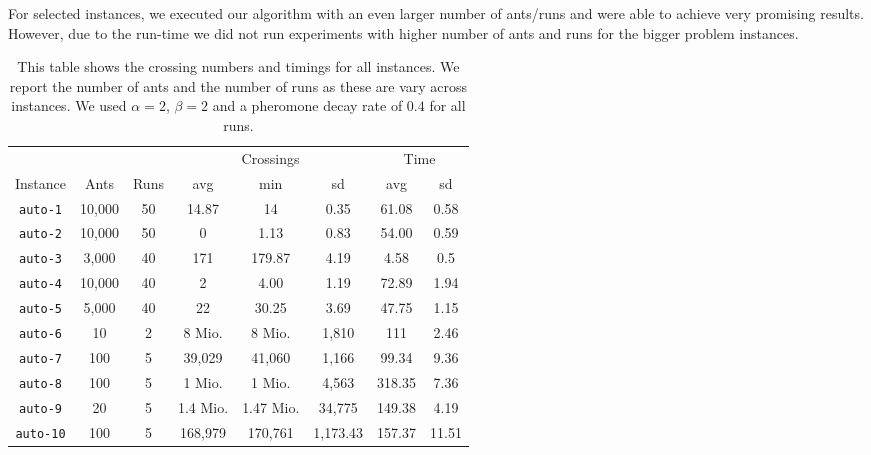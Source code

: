 \documentclass{scrartcl}
\begin{document}
For selected instances, we executed our algorithm with an even larger
number of ants/runs and were able to achieve very promising
results. However, due to the run-time we did not run experiments with 
higher number of ants and runs for the bigger problem instances.



\begin{table}[!H]
\scriptsize
\centering
\begin{tabular}{cccccccc}
\toprule
 & & & \multicolumn{3}{c}{Crossings} & \multicolumn{2}{c}{Time} \\
Instance & Ants & Runs & avg & min & sd & avg & sd \\
\midrule
\texttt{auto-1} & 10,000 & 50 & 14.87 & 14 & 0.35 & 61.08 & 0.58  \\
\texttt{auto-2} & 10,000 & 50 & 0 & 1.13 & 0.83 & 54.00 & 0.59 \\
\texttt{auto-3} & 3,000  & 40 & 171 & 179.87 & 4.19 & 4.58 & 0.5 \\
\texttt{auto-4} & 10,000 & 40 & 2 & 4.00 & 1.19 & 72.89 & 1.94 \\
\texttt{auto-5} & 5,000 & 40 & 22 & 30.25 & 3.69 & 47.75 & 1.15 \\
\texttt{auto-6} & 10 & 2 & 8 Mio. & 8 Mio. & 1,810 & 111 & 2.46 \\
\texttt{auto-7} & 100 & 5 & 39,029 & 41,060 & 1,166 & 99.34 & 9.36 \\
\texttt{auto-8} & 100 & 5 & 1 Mio. & 1 Mio.  & 4,563 & 318.35 & 7.36 \\
\texttt{auto-9} & 20 & 5 & 1.4 Mio. & 1.47 Mio. & 34,775 & 149.38 & 4.19 \\
\texttt{auto-10} & 100 & 5 & 168,979 & 170,761 & 1,173.43 & 157.37 & 11.51 \\
\bottomrule

\end{tabular}
\caption{This table shows the crossing numbers and timings for all
  instances. We report the number of ants and the number of runs as
  these are vary across instances. We used $\alpha=2$, $\beta=2$ and a
  pheromone decay rate of $0.4$ for all runs.}
\label{tab:results}
\end{table}

\clearpage
\end{document}
